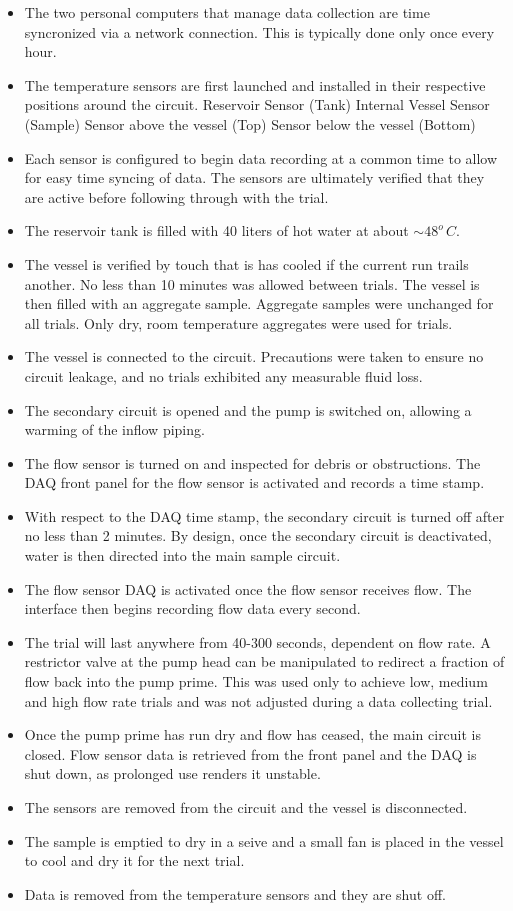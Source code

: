 \begin{itemize}
 \item The two personal computers that manage data collection are time syncronized via a network connection. This is typically  done only once every hour. 
 \item The temperature sensors are first launched and installed in their respective positions around the circuit.
	\subitem Reservoir Sensor (Tank)
        \subitem Internal Vessel Sensor (Sample)
	\subitem Sensor above the vessel (Top)
        \subitem Sensor below the vessel (Bottom)
 \item Each sensor is configured to begin data recording at a common time to allow for easy time syncing of data. The sensors are ultimately verified that they are active before following through with the trial.
 \item The reservoir tank is filled with 40 liters of hot water at about $\sim48^{o}\,C$.
 \item The vessel is verified by touch that is has cooled if the current run trails another. No less than 10 minutes was allowed between trials. The vessel is then filled with an aggregate sample. Aggregate samples were unchanged for all trials. Only dry, room temperature aggregates were used for trials.
 \item The vessel is connected to the circuit. Precautions were taken to ensure no circuit leakage, and no trials exhibited any measurable fluid loss.
 \item The secondary circuit is opened and the pump is switched on, allowing a warming of the inflow piping. 
 \item The flow sensor is turned on and inspected for debris or obstructions. The DAQ front panel for the flow sensor is activated and records a time stamp.
 \item With respect to the DAQ time stamp, the secondary circuit is turned off after no less than 2 minutes. By design, once the secondary circuit is deactivated, water is then directed into the main sample circuit. 
 \item The flow sensor DAQ is activated once the flow sensor receives flow. The interface then begins recording flow data every second.
 \item The trial will last anywhere from 40-300 seconds, dependent on flow rate. A restrictor valve at the pump head can be manipulated to redirect a fraction of flow back into the pump prime. This was used only to achieve low, medium and high flow rate trials and was not adjusted during a data collecting trial.
 \item Once the pump prime has run dry and flow has ceased, the main circuit is closed. Flow sensor data is retrieved from the front panel and the DAQ is shut down, as prolonged use renders it unstable.
 \item The sensors are removed from the circuit and the vessel is disconnected.
 \item The sample is emptied to dry in a seive and a small fan is placed in the vessel to cool and dry it for the next trial.
 \item Data is removed from the temperature sensors and they are shut off.
\end{itemize}

